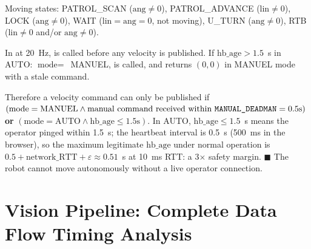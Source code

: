 \begin{eqblock}
Moving states: PATROL\_SCAN ($\text{ang}\neq0$), PATROL\_ADVANCE ($\text{lin}\neq0$), LOCK ($\text{ang}\neq0$), WAIT ($\text{lin}=\text{ang}=0$, not moving), U\_TURN ($\text{ang}\neq0$), RTB ($\text{lin}\neq0$ and/or $\text{ang}\neq0$).

In  at 20~Hz,  is called before any velocity is published. If $\text{hb\_age} > 1.5$~s in AUTO: $\text{mode}=$~MANUEL,  is called, and  returns $(0,0)$ in MANUEL mode with a stale command.

Therefore a velocity command can only be published if $(\text{mode}=\text{MANUEL} \wedge \text{manual command received within } \code{MANUAL\_DEADMAN}=0.5\text{s})$ \textbf{or} $(\text{mode}=\text{AUTO} \wedge \text{hb\_age} \leq 1.5\text{s})$. In AUTO, $\text{hb\_age}\leq1.5$~s means the operator pinged within 1.5~s; the heartbeat interval is 0.5~s (500~ms  in the browser), so the maximum legitimate $\text{hb\_age}$ under normal operation is $0.5+\text{network\_RTT}+\varepsilon \approx 0.51$~s at 10~ms RTT: a 3$\times$ safety margin. $\blacksquare$ The robot cannot move autonomously without a live operator connection.
\end{eqblock}

\section{Vision Pipeline: Complete Data Flow Timing Analysis}

